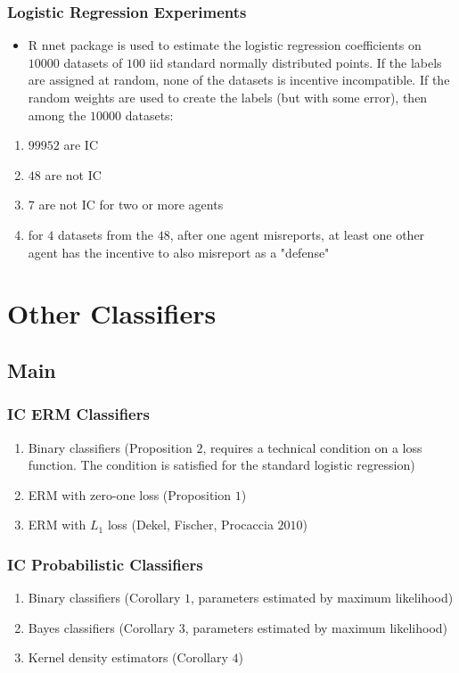 \documentclass{beamer}
\begin{document}
\begin{frame} \frametitle{Logistic Regression Experiments}
\begin{itemize}
\item R nnet package is used to estimate the logistic regression coefficients on $10000$ datasets of $100$ iid standard normally distributed points. If the labels are assigned at random, none of the datasets is incentive incompatible. If the random weights are used to create the labels (but with some error), then among the $10000$ datasets:
\end{itemize}
\begin{enumerate}
\item $99952$ are IC
\item $48$ are not IC
\item $7$ are not IC for two or more agents
\item for $4$ datasets from the $48$, after one agent misreports, at least one other agent has the incentive to also misreport as a "defense"
\end{enumerate}

\end{frame}



\section{Other Classifiers} \subsection{Main}

\begin{frame} \frametitle{IC ERM Classifiers}
\begin{enumerate}
\item Binary classifiers (Proposition $2$, requires a technical condition on a loss function. The condition is satisfied for the standard logistic regression)
\item ERM with zero-one loss (Proposition $1$)
\item ERM with $L_{1}$ loss (Dekel, Fischer, Procaccia $2010$)
\end{enumerate}

\end{frame}

\begin{frame} \frametitle{IC Probabilistic Classifiers}
\begin{enumerate}
\item Binary classifiers (Corollary $1$, parameters estimated by maximum likelihood)
\item Bayes classifiers (Corollary $3$, parameters estimated by maximum likelihood)
\item Kernel density estimators (Corollary $4$)
\end{enumerate}

\end{frame}
\end{document}
